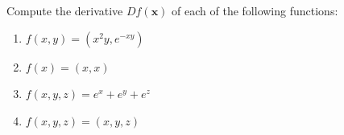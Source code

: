 \documentclass[openany]{book}
\begin{document}
\begin{prob}[3]
    Compute the derivative \( Df(\mathbf{x}) \) of each of the following functions:

    \begin{enumerate}
        \item[(a)] \( f(x, y) = (x^2y, e^{-xy}) \)
        \item[(b)] \( f(x) = (x, x) \)
        \item[(c)] \( f(x, y, z) = e^x + e^y + e^z \)
        \item[(d)] \( f(x, y, z) = (x, y, z) \)
    \end{enumerate}
\end{prob}
\end{document}
